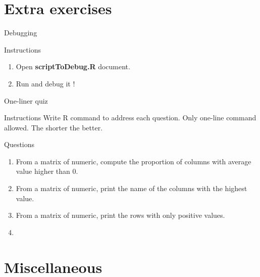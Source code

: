 \documentclass[10pt]{beamer}
\begin{document}

\section{Extra exercises}

\begin{frame}{Debugging}
  \begin{block}{Instructions}
    \begin{enumerate}
    \item Open {\bf scriptToDebug.R} document.
    \item Run and debug it !
    \end{enumerate}
  \end{block}
\end{frame}

\begin{frame}{One-liner quiz}
  \begin{block}{Instructions}
    Write R command to address each question. Only one-line command allowed. The shorter the better.
  \end{block}
  \begin{block}{Questions}
    \begin{enumerate}
    \item From a matrix of numeric, compute the proportion of columns with average value higher than 0.
    \item From a matrix of numeric, print the name of the columns with the highest value.
    \item From a matrix of numeric, print the rows with only positive values.
    \item 
    \end{enumerate}
  \end{block}
\end{frame}

\section{Miscellaneous}
\end{document}
